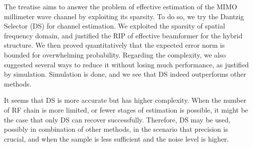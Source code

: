 
\startchapter [title={Conclusion}]

The treatise aims to answer the problem of effective estimation of the MIMO millimeter wave channel by exploiting its sparsity.
To do so, we try the Dantzig Selector (DS) for channel estimation.
We exploited the sparsity of spatial frequency domain, and justified the RIP of effective beamformer for the hybrid structure.
We then proved quantitatively that the expected error norm is bounded for overwhelming probability.
Regarding the complexity, we also suggested several ways to reduce it without losing much performance, as justified by simulation.
Simulation is done, and we see that DS indeed outperforms other methods.

It seems that DS is more accurate but has higher complexity.
When the number of RF chain is more limited, or fewer stages of estimation is possible, it might be the case that only DS can recover successfully.
Therefore, DS may be used, possibly in combination of other methods, in the scenario that precision is crucial, and when the sample is less sufficient and the noise level is higher.


\stopchapter


